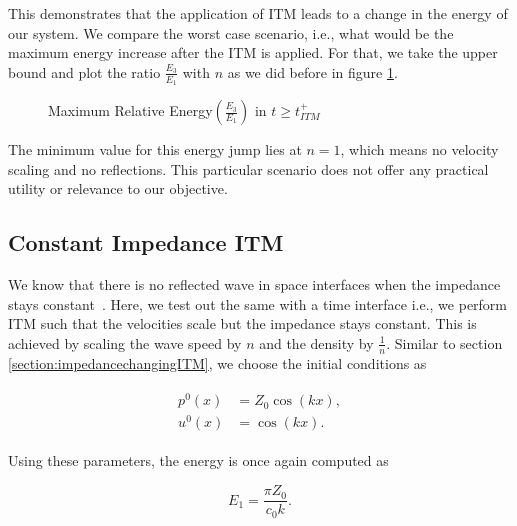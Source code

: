 This demonstrates that the application of \ac{ITM} leads to a change in the energy of our system. We compare the worst case scenario, i.e., what would be the maximum energy increase after the ITM is applied. For that,
 we take the upper bound and plot the ratio $\frac{E_3}{E_1}$ with $n$ as we did before in figure \ref{fig:ratio2}.

\begin{figure}
    \centering
    \caption{Maximum Relative Energy$\left(\frac{E_3}{E_1}\right)$ in $t \geq t_{ITM}^+$}
    \label{fig:ratio2}
\end{figure}

The minimum value for this energy jump lies at $n=1$, which means no velocity scaling and no reflections. This particular scenario does not offer any practical utility
or relevance to our objective.

\subsection{\texorpdfstring{Constant Impedance \ac{ITM}}{Constant Impedance ITM}}
We know that there is no reflected wave in space interfaces when the impedance stays constant~\parencite[Sec 9.7]{leveque_2002}. Here, we test out the same with a time interface i.e., we perform \ac{ITM} such that the velocities scale but the impedance stays constant. This is achieved by scaling the wave speed by $n$ and the density by $\frac{1}{n}$.
Similar to section \ref{section:impedancechangingITM}, we choose the initial conditions as

\begin{align}
    \begin{split}
        p^0\left(x\right) &= Z_0 \cos\left(kx\right), \\
        u^0\left(x\right) &= \cos\left(kx\right) .
    \end{split}
    \label{eq:initialconditions2}
\end{align}

Using these parameters, the energy is once again computed as

\begin{equation}
    E_1 = \frac{\pi Z_0}{c_0 k} .
\end{equation}

